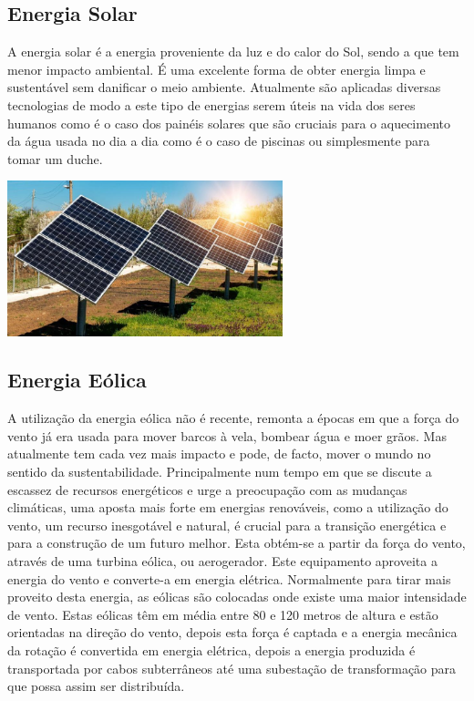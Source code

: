 \documentclass{report}
\begin{document}
\subsection{Energia Solar}

A energia solar é a energia proveniente da luz e do calor do Sol, sendo a que tem menor impacto ambiental. É uma excelente forma de obter energia limpa e sustentável sem danificar o meio ambiente. Atualmente são aplicadas diversas tecnologias de modo a este tipo de energias serem úteis na vida dos seres humanos como é o caso dos painéis solares que são cruciais para o aquecimento da água usada no dia a dia como é o caso de piscinas ou simplesmente para tomar um duche.

\begin{center}
\includegraphics[width=8cm]{energia solar.jpeg}
\end{center}

\subsection{Energia Eólica}
A utilização da energia eólica não é recente, remonta a épocas em que a força do vento já era usada para mover barcos à vela, bombear água e moer grãos. Mas atualmente tem cada vez mais impacto e pode, de facto, mover o mundo no sentido da sustentabilidade. Principalmente num tempo em que se discute a escassez de recursos energéticos e urge a preocupação com as mudanças climáticas, uma aposta mais forte em energias renováveis, como a utilização do vento, um recurso inesgotável e natural, é crucial para a transição energética e para a construção de um futuro melhor.
Esta obtém-se a partir da força do vento, através de uma turbina eólica, ou aerogerador. Este equipamento aproveita a energia do vento e converte-a em energia elétrica. Normalmente para tirar mais proveito desta energia, as eólicas são colocadas onde existe uma maior intensidade de vento. 
Estas eólicas têm em média entre 80 e 120 metros de altura e estão orientadas na direção do vento, depois esta força é captada e a energia mecânica da rotação é convertida em energia elétrica, depois a energia produzida é transportada por cabos subterrâneos até uma subestação de transformação para que possa assim ser distribuída. 
\end{document}

